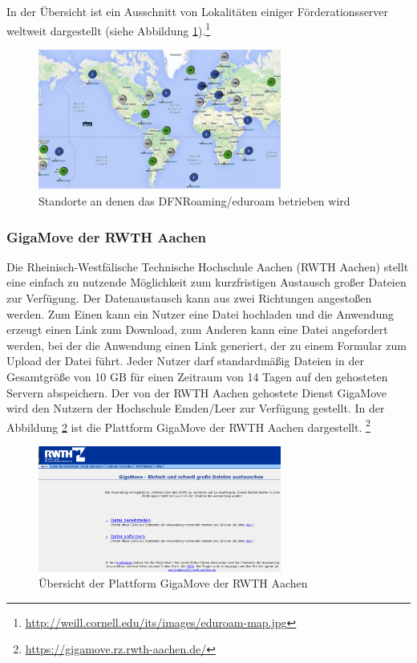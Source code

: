 In der Übersicht ist ein Ausschnitt von Lokalitäten einiger Förderationsserver weltweit dargestellt (siehe Abbildung \ref{fig_map_eduroam}).\footnote{\url{http://weill.cornell.edu/its/images/eduroam-map.jpg}}

\begin{figure}[h!]
	\centering
	\includegraphics[width=8cm]{kapitel/gruppe2/bilder/eduroam_map}
	\caption{Standorte an denen das DFNRoaming/eduroam betrieben wird}
	\label{fig_map_eduroam}
\end{figure}

\subsubsection{GigaMove der RWTH Aachen}
Die Rheinisch-Westfälische Technische Hochschule Aachen (RWTH Aachen) stellt eine einfach zu nutzende Möglichkeit zum kurzfristigen Austausch großer Dateien zur Verfügung. Der Datenaustausch kann aus zwei Richtungen angestoßen werden. Zum Einen kann ein Nutzer eine Datei hochladen und die Anwendung erzeugt einen Link zum Download, zum Anderen kann eine Datei angefordert werden, bei der die Anwendung einen Link generiert, der zu einem Formular zum Upload der Datei führt. Jeder Nutzer darf standardmäßig Dateien in der Gesamtgröße von 10 GB für einen Zeitraum von 14 Tagen auf den gehosteten Servern abspeichern. Der von der RWTH Aachen gehostete Dienst GigaMove wird den Nutzern der Hochschule Emden/Leer zur Verfügung gestellt. In der Abbildung \ref{fig_rwth_gigamove} ist die Plattform GigaMove der RWTH Aachen dargestellt. \footnote{\url{https://gigamove.rz.rwth-aachen.de/}} 

\begin{figure}
	\centering
	\includegraphics[width=8cm]{kapitel/gruppe2/bilder/rwth_gigamove}
	\caption{Übersicht der Plattform GigaMove der RWTH Aachen}
	\label{fig_rwth_gigamove}
\end{figure}

